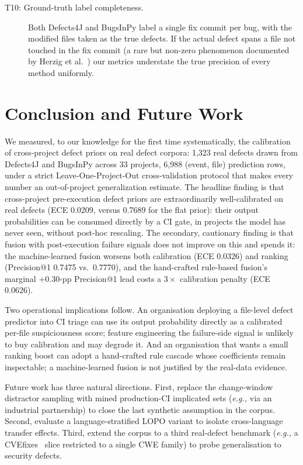 \documentclass[preprint,12pt]{elsarticle}
\begin{document}
\begin{description}
\item[T10: Ground-truth label completeness.] Both Defects4J and BugsInPy label a single fix commit per bug, with the modified files taken as the true defects. If the actual defect spans a file not touched in the fix commit (a rare but non-zero phenomenon documented by Herzig et al.~\cite{herzig2013}) our metrics understate the true precision of every method uniformly.
\end{description}

\section{Conclusion and Future Work}
\label{sec:conclusion}

We measured, to our knowledge for the first time systematically, the calibration of cross-project defect priors on real defect corpora: 1{,}323 real defects drawn from Defects4J and BugsInPy across 33 projects, 6{,}988 (event, file) prediction rows, under a strict Leave-One-Project-Out cross-validation protocol that makes every number an out-of-project generalization estimate. The headline finding is that cross-project pre-execution defect priors are extraordinarily well-calibrated on real defects (ECE 0.0209, versus 0.7689 for the flat prior): their output probabilities can be consumed directly by a CI gate, in projects the model has never seen, without post-hoc rescaling. The secondary, cautionary finding is that fusion with post-execution failure signals does not improve on this and spends it: the machine-learned fusion worsens both calibration (ECE 0.0326) and ranking (Precision@1 0.7475 vs.\ 0.7770), and the hand-crafted rule-based fusion's marginal $+0.30$-pp Precision@1 lead costs a $3\times$ calibration penalty (ECE 0.0626).

Two operational implications follow. An organisation deploying a file-level defect predictor into CI triage can use its output probability directly as a calibrated per-file suspiciousness score; feature engineering the failure-side signal is unlikely to buy calibration and may degrade it. And an organisation that wants a small ranking boost can adopt a hand-crafted rule cascade whose coefficients remain inspectable; a machine-learned fusion is not justified by the real-data evidence.

Future work has three natural directions. First, replace the change-window distractor sampling with mined production-CI implicated sets (\emph{e.g.,} via an industrial partnership) to close the last synthetic assumption in the corpus. Second, evaluate a language-stratified LOPO variant to isolate cross-language transfer effects. Third, extend the corpus to a third real-defect benchmark (\emph{e.g.,} a CVEfixes~\cite{sliwerski2005} slice restricted to a single CWE family) to probe generalisation to security defects.
\end{document}
